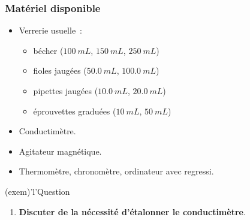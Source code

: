 \documentclass[../main/main.tex]{subfiles}
\begin{document}
\subsubsection{Matériel disponible}
\begin{itemize}
	\item Verrerie usuelle~:\smallbreak
	      \begin{minipage}{0.50\linewidth}
		      \begin{itemize}
			      \item bécher ($\SI{100}{mL}$, $\SI{150}{mL}$, $\SI{250}{mL}$)
			      \item fioles jaugées ($\SI{50,0}{mL}$, $\SI{100,0}{mL}$)
		      \end{itemize}
	      \end{minipage}
	      \begin{minipage}{0.50\linewidth}
		      \begin{itemize}
			      \item pipettes jaugées ($\SI{10,0}{mL}$, $\SI{20,0}{mL}$)
			      \item éprouvettes graduées ($\SI{10}{mL}$, $\SI{50}{mL}$)
		      \end{itemize}
	      \end{minipage}
	\item Conductimètre.
	\item Agitateur magnétique.
	\item Thermomètre, chronomètre, ordinateur avec regressi.
\end{itemize}

\vspace{-10pt}
\begin{tcb}(exem)'l'{\tiny Question}
	\begin{enumerate}[label=\sqenumi, start=12]
		\item \textbf{Discuter de la nécessité d'étalonner le conductimètre}.
	\end{enumerate}
\end{tcb}
\vspace{-10pt}
\end{document}
